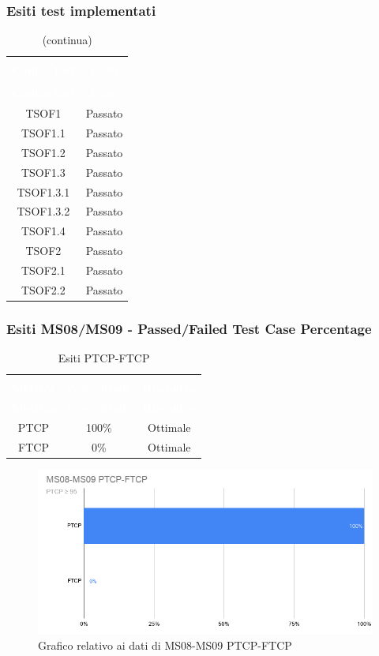 \subsubsection{Esiti test implementati}
\begin{longtable}{c c}
\rowcolor{white}\caption{Esiti dei test implementati} \\
	\rowcolor{redafk}
\textcolor{white}{\textbf{Codice test}} &
\textcolor{white}{\textbf{Esito}} \\
	\endfirsthead
		\rowcolor{white}\caption[]{(continua)} \\
		\rowcolor{redafk}
\textcolor{white}{\textbf{Codice test}} &
\textcolor{white}{\textbf{Esito}} \\
	\endhead
	TSOF1 & Passato \\
	TSOF1.1 & Passato \\ 
	TSOF1.2 & Passato \\
	TSOF1.3 & Passato \\
	TSOF1.3.1 & Passato \\
	TSOF1.3.2 & Passato \\
	TSOF1.4 & Passato \\
	TSOF2 & Passato \\
	TSOF2.1 & Passato \\
	TSOF2.2 & Passato 
	
\end{longtable}

\subsubsection{Esiti MS08/MS09 - Passed/Failed Test Case Percentage}
\begin{longtable}{c c c}
\rowcolor{white}\caption{Esiti PTCP-FTCP} \\
	\rowcolor{redafk}
\textcolor{white}{\textbf{Metrica}} &
\textcolor{white}{\textbf{Percentuale}} & 
\textcolor{white}{\textbf{Riscontro}} \\
	\endfirsthead
\textcolor{white}{\textbf{Metrica}} &
\textcolor{white}{\textbf{Percentuale}} & 
\textcolor{white}{\textbf{Riscontro}} \\
	\endhead
	PTCP & 100\% & Ottimale\\
	FTCP & 0\% & Ottimale\\
\end{longtable}

\begin{figure}[H]
\centering
\includegraphics[scale=0.5]{./img/MS08-MS09.png}
\caption{Grafico relativo ai dati di MS08-MS09 PTCP-FTCP}
\end{figure}


